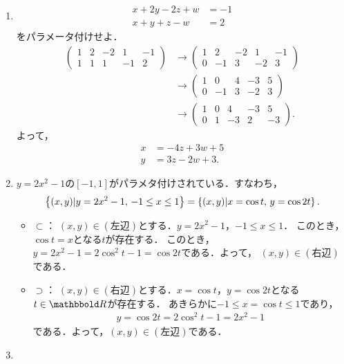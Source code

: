 \documentclass[9pt]{ltjsarticle}
\begin{document}
\begin{enumerate}[label=(問題\arabic*)]
 \item
\begin{align}
 x + 2 y -2 z + w &= -1\\
 x+y+z-w& =2
\end{align}
をパラメータ付けせよ．
\begin{align}
\begin{pmatrix}
 1 & 2 & -2 & 1 & -1\\
 1&1 &1 &-1 & 2
\end{pmatrix}
&\to
\begin{pmatrix}
 1 & 2 & -2 & 1 & -1\\
 0&-1 &3 &-2 & 3
\end{pmatrix} \\
&\to
\begin{pmatrix}
 1 & 0 & 4 & -3 & 5\\
 0&-1 &3 &-2 & 3
\end{pmatrix} \\
 &\to
\begin{pmatrix}
 1 & 0 & 4 & -3 & 5\\
 0&1 &-3 &2 & -3
\end{pmatrix} .
\end{align}
よって，
\begin{align}
 x &= -4z + 3w + 5\\
 y& = 3z -2w + 3.
\end{align}
 \item
$y=2x^2-1$の$[-1,1]$がパラメタ付けされている．すなわち，
\begin{align}
 \left\{(x,y)| y=2x^2-1,\, -1 \le x \le 1\right\}
=
\left\{(x,y) | x=\cos t,\, y = \cos 2t\right\}.
\end{align}
\begin{itemize}
 \item $\subset$：
$(x,y)\in (左辺)$とする．$y=2x^2-1$，$-1\le x \le 1$．
このとき，$\cos t = x$となる$t$が存在する．
このとき，$y=2x^2-1=2\cos^2 t - 1 = \cos 2t$である．よって，
$(x,y)\in (右辺)$である．
 \item $\supset$：
$(x,y)\in (右辺)$とする．$x=\cos t$，$y=\cos 2t$となる$t\in \R$が存在する．
あきらかに$-1\le x = \cos t \le 1$であり，
\begin{align}
 y = \cos 2t  = 2\cos^2 t-1 = 2x^2 -1
\end{align}
である．よって，$(x,y)\in (左辺)$である．
\end{itemize}
 \item
\begin{align}

\end{align}
\end{enumerate}
\end{document}
